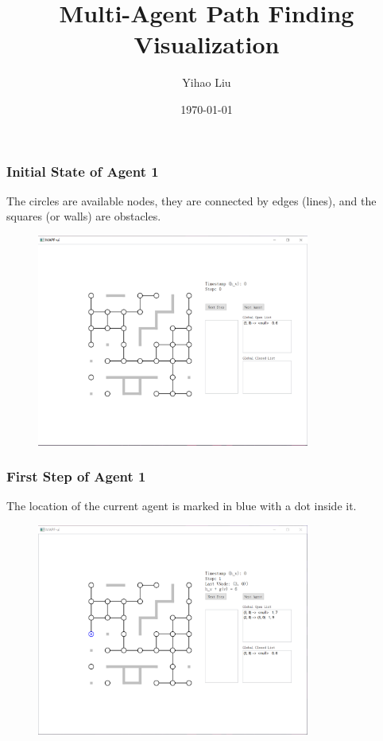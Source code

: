 \documentclass{beamer}
\date{\today}
\title{Multi-Agent Path Finding Visualization}
\author{Yihao Liu}
\begin{document}
\begin{frame}
  \titlepage
\end{frame}

\begin{frame}
\frametitle{Initial State of Agent 1}
The circles are available nodes, they are connected by edges (lines), and the squares (or walls) are obstacles.
\begin{figure}
\centering
\includegraphics[width=0.8\textwidth]{1.png}
\end{figure}
\end{frame}

\begin{frame}
\frametitle{First Step of Agent 1}
The location of the current agent is marked in blue with a dot inside it.
\begin{figure}
\centering
\includegraphics[width=0.8\textwidth]{2.png}
\end{figure}
\end{frame}
\end{document}
